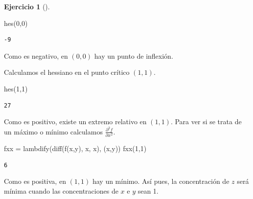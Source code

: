 \documentclass[
  a4paper,
]{scrreport}
\newenvironment{Shaded}{\begin{snugshade}}{\end{snugshade}}
\newcommand{\FloatTok}[1]{\textcolor[rgb]{0.68,0.00,0.00}{#1}}
\newcommand{\FunctionTok}[1]{\textcolor[rgb]{0.28,0.35,0.67}{#1}}
\newcommand{\NormalTok}[1]{\textcolor[rgb]{0.00,0.23,0.31}{#1}}
\newcommand{\OperatorTok}[1]{\textcolor[rgb]{0.37,0.37,0.37}{#1}}
\theoremstyle{definition}
\newtheorem{exercise}{Ejercicio}[chapter]
\theoremstyle{remark}
\begin{document}
\begin{exercise}[]
\begin{enumerate}
\begin{tcolorbox}
\begin{Shaded}
\begin{Highlighting}[]
\FunctionTok{hes}\NormalTok{(}\FloatTok{0}\NormalTok{,}\FloatTok{0}\NormalTok{)}
\end{Highlighting}
\end{Shaded}

\begin{verbatim}
-9
\end{verbatim}

  Como es negativo, en \((0,0)\) hay un punto de inflexión.

  Calculamos el hessiano en el punto crítico \((1,1)\).

\begin{Shaded}
\begin{Highlighting}[]
\FunctionTok{hes}\NormalTok{(}\FloatTok{1}\NormalTok{,}\FloatTok{1}\NormalTok{)}
\end{Highlighting}
\end{Shaded}

\begin{verbatim}
27
\end{verbatim}

  Como es positivo, existe un extremo relativo en \((1,1)\). Para ver si
  se trata de un máximo o mínimo calculamos
  \(\frac{\partial^2 f}{\partial x^2}\).

\begin{Shaded}
\begin{Highlighting}[]
\NormalTok{fxx }\OperatorTok{=} \FunctionTok{lambdify}\NormalTok{(}\FunctionTok{diff}\NormalTok{(}\FunctionTok{f}\NormalTok{(x,y), x, x), (x,y))}
\FunctionTok{fxx}\NormalTok{(}\FloatTok{1}\NormalTok{,}\FloatTok{1}\NormalTok{)}
\end{Highlighting}
\end{Shaded}

\begin{verbatim}
6
\end{verbatim}

  Como es positiva, en \((1,1)\) hay un mínimo. Así pues, la
  concentración de \(z\) será mínima cuando las concentraciones de \(x\)
  e \(y\) sean 1.

  \end{tcolorbox}
\end{enumerate}

\end{exercise}
\end{document}
